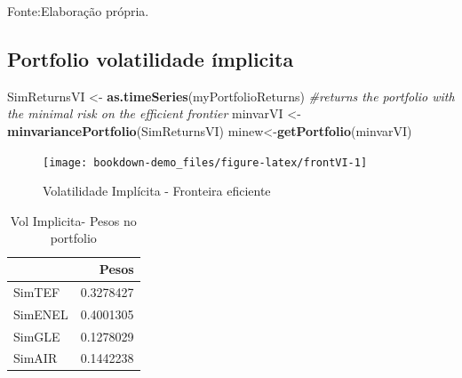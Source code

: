 \documentclass[
  12pt,
  a4paper,
  openany]{book}
\newenvironment{Shaded}{\begin{snugshade}}{\end{snugshade}}
\newcommand{\CommentTok}[1]{\textcolor[rgb]{0.56,0.35,0.01}{\textit{#1}}}
\newcommand{\DataTypeTok}[1]{\textcolor[rgb]{0.13,0.29,0.53}{#1}}
\newcommand{\DecValTok}[1]{\textcolor[rgb]{0.00,0.00,0.81}{#1}}
\newcommand{\FloatTok}[1]{\textcolor[rgb]{0.00,0.00,0.81}{#1}}
\newcommand{\KeywordTok}[1]{\textcolor[rgb]{0.13,0.29,0.53}{\textbf{#1}}}
\newcommand{\NormalTok}[1]{#1}
\newcommand{\OperatorTok}[1]{\textcolor[rgb]{0.81,0.36,0.00}{\textbf{#1}}}
\newcommand{\StringTok}[1]{\textcolor[rgb]{0.31,0.60,0.02}{#1}}
\begin{document}
Fonte:Elaboração própria.

\justifying
\bigskip

\hypertarget{portfolio-volatilidade-uxedmplicita}{%
\subsection{Portfolio volatilidade ímplicita}\label{portfolio-volatilidade-uxedmplicita}}

\scriptsize

\begin{Shaded}
\begin{Highlighting}[]
\NormalTok{SimReturnsVI \textless{}{-}}\StringTok{ }\KeywordTok{as.timeSeries}\NormalTok{(myPortfolioReturns)}
\CommentTok{\#returns the portfolio with the minimal risk on the efficient frontier}
\NormalTok{minvarVI \textless{}{-}}\StringTok{ }\KeywordTok{minvariancePortfolio}\NormalTok{(SimReturnsVI) }
\NormalTok{minew\textless{}{-}}\KeywordTok{getPortfolio}\NormalTok{(minvarVI)}
\end{Highlighting}
\end{Shaded}

\normalsize

\begin{figure}

{\centering \texttt{[image: bookdown-demo\_files/figure-latex/frontVI-1]} 

}

\caption{Volatilidade Implícita - Fronteira eficiente}\label{fig:frontVI}
\end{figure}

\begin{table}[!h]

\caption{\label{tab:unnamed-chunk-56}Vol Implicita- Pesos no portfolio}
\centering
\begin{tabular}[t]{lr}
\toprule
  & Pesos\\
\midrule
SimTEF & 0.3278427\\
SimENEL & 0.4001305\\
SimGLE & 0.1278029\\
SimAIR & 0.1442238\\
\bottomrule
\end{tabular}
\end{table}

\scriptsize

\begin{Shaded}
\end{Shaded}
\end{document}
